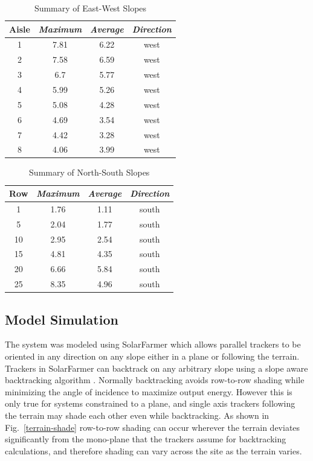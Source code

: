 \documentclass[conference]{IEEEtran}
\begin{document}
\begin{table}[htbp]
\caption{Summary of East-West Slopes}
\begin{center}
\begin{tabular}{|c|c|c|c|}
\hline
\textbf{Aisle} & \textbf{\textit{Maximum}}& \textbf{\textit{Average}}& \textbf{\textit{Direction}} \\
\hline
1& 7.81& 6.22& west \\
\hline
2& 7.58& 6.59& west \\
\hline
3& 6.7& 5.77& west \\
\hline
4&5.99& 5.26& west \\
\hline
5& 5.08& 4.28& west \\
\hline
6& 4.69& 3.54& west \\
\hline
7& 4.42& 3.28& west \\
\hline
8& 4.06& 3.99& west \\
\hline
\end{tabular}
\label{table:ew-slope-summary}
\end{center}
\end{table}

\begin{table}[htbp]
\caption{Summary of North-South Slopes}
\begin{center}
\begin{tabular}{|c|c|c|c|}
\hline
\textbf{Row} & \textbf{\textit{Maximum}}& \textbf{\textit{Average}}& \textbf{\textit{Direction}} \\
\hline
1&  1.76&  1.11& south \\
\hline
5&  2.04&  1.77& south \\
\hline
10& 2.95&  2.54& south \\
\hline
15& 4.81&  4.35& south \\
\hline
20& 6.66&  5.84& south \\
\hline
25& 8.35&  4.96& south \\
\hline
\end{tabular}
\label{table:row-slope-summary}
\end{center}
\end{table}

\subsection{Model Simulation}

The system was modeled using SolarFarmer \cite{Mikofski_8547323} which allows parallel trackers to be oriented in any direction on any slope either in a plane or following the terrain. Trackers in SolarFarmer can backtrack on any arbitrary slope using a slope aware backtracking algorithm \cite{Anderson2020}. Normally backtracking avoids row-to-row shading while minimizing the angle of incidence to maximize output energy. However this is only true for systems constrained to a plane, and single axis trackers following the terrain may shade each other even while backtracking. As shown in Fig.~\ref{terrain-shade} row-to-row shading can occur wherever the terrain deviates significantly from the mono-plane that the trackers assume for backtracking calculations, and therefore shading can vary across the site as the terrain varies.
\end{document}
